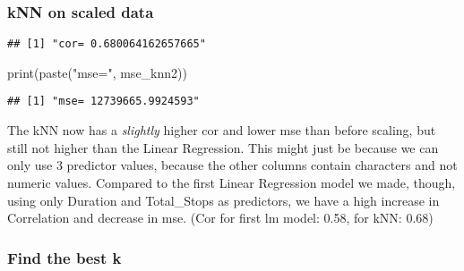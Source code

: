 \documentclass[
]{article}
\newenvironment{Shaded}{\begin{snugshade}}{\end{snugshade}}
\newcommand{\AttributeTok}[1]{\textcolor[rgb]{0.77,0.63,0.00}{#1}}
\newcommand{\DecValTok}[1]{\textcolor[rgb]{0.00,0.00,0.81}{#1}}
\newcommand{\FunctionTok}[1]{\textcolor[rgb]{0.00,0.00,0.00}{#1}}
\newcommand{\NormalTok}[1]{#1}
\newcommand{\OtherTok}[1]{\textcolor[rgb]{0.56,0.35,0.01}{#1}}
\newcommand{\SpecialCharTok}[1]{\textcolor[rgb]{0.00,0.00,0.00}{#1}}
\newcommand{\StringTok}[1]{\textcolor[rgb]{0.31,0.60,0.02}{#1}}
\begin{document}
\hypertarget{knn-on-scaled-data}{%
\subsubsection{kNN on scaled data}\label{knn-on-scaled-data}}

\begin{Shaded}
\end{Shaded}

\begin{verbatim}
## [1] "cor= 0.680064162657665"
\end{verbatim}

\begin{Shaded}
\begin{Highlighting}[]
\FunctionTok{print}\NormalTok{(}\FunctionTok{paste}\NormalTok{(}\StringTok{"mse="}\NormalTok{, mse\_knn2))}
\end{Highlighting}
\end{Shaded}

\begin{verbatim}
## [1] "mse= 12739665.9924593"
\end{verbatim}

The kNN now has a \emph{slightly} higher cor and lower mse than before
scaling, but still not higher than the Linear Regression. This might
just be because we can only use 3 predictor values, because the other
columns contain characters and not numeric values. Compared to the first
Linear Regression model we made, though, using only Duration and
Total\_Stops as predictors, we have a high increase in Correlation and
decrease in mse. (Cor for first lm model: 0.58, for kNN: 0.68)

\hypertarget{find-the-best-k}{%
\subsubsection{Find the best k}\label{find-the-best-k}}
\end{document}
